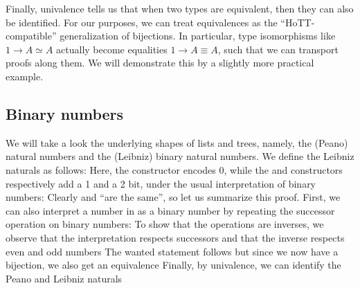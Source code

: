 \documentclass[../Main.tex]{subfiles}
\begin{document}
Finally, univalence tells us that when two types are equivalent, then they can also be identified. 
For our purposes, we can treat equivalences as the ``HoTT-compatible'' generalization of bijections. In particular, type isomorphisms like $1 \to A \simeq A$ actually become equalities $1 \to A \equiv A$, such that we can transport proofs along them. We will demonstrate this by a slightly more practical example.


\subsection{Binary numbers}
We will take a look the underlying shapes of lists and trees, namely, the (Peano) natural numbers and the (Leibniz) binary natural numbers. We define the Leibniz naturals as follows:
Here, the  constructor encodes 0, while the  and  constructors respectively add a 1 and a 2 bit, under the usual interpretation of binary numbers:
Clearly  and  ``are the same'', so let us summarize this proof. First, we can also interpret a number in  as a binary number by repeating the successor operation on binary numbers:
To show that the operations are inverses, we observe that the interpretation respects successors
and that the inverse respects even and odd numbers
The wanted statement follows
but since we now have a bijection, we also get an equivalence
Finally, by univalence, we can identify the Peano and Leibniz naturals

\end{document}
